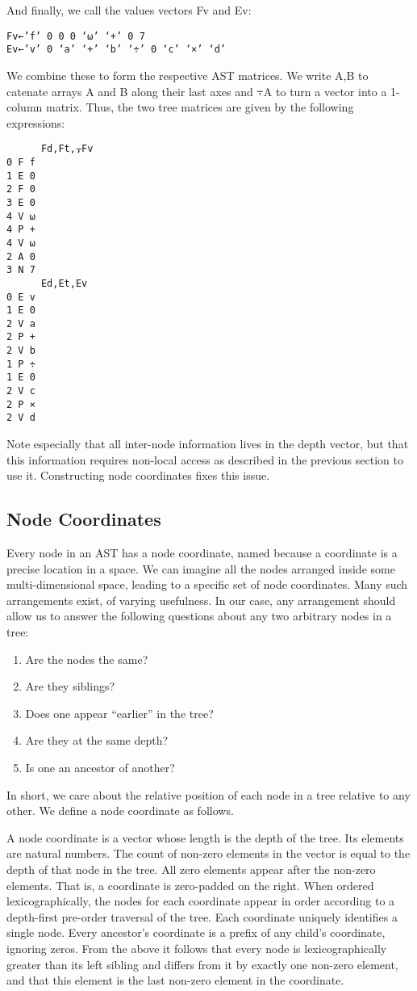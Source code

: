 \documentclass[numbers,preprint]{sigplanconf}
\begin{document}
And finally, we call the values vectors Fv and Ev:

\begin{verbatim}
Fv←’f’ 0 0 0 ‘⍵’ ‘+’ 0 7
Ev←’v’ 0 ‘a’ ‘+’ ‘b’ ‘÷’ 0 ‘c’ ‘×’ ‘d’
\end{verbatim}

We combine these to form the respective AST matrices. We write A,B
to catenate arrays A and B along their last axes and ⍪A to turn a
vector into a 1-column matrix. Thus, the two tree matrices are given
by the following expressions:

\begin{verbatim}
      Fd,Ft,⍪Fv
0 F f
1 E 0
2 F 0
3 E 0
4 V ⍵
4 P +
4 V ⍵
2 A 0
3 N 7
      Ed,Et,Ev
0 E v
1 E 0
2 V a
2 P +
2 V b
1 P ÷
1 E 0
2 V c
2 P ×
2 V d
\end{verbatim}

Note especially that all inter-node information lives in the depth
vector, but that this information requires non-local access as
described in the previous section to use it. Constructing node
coordinates fixes this issue.

\subsection{Node Coordinates}

Every node in an AST has a node coordinate, named because a coordinate
is a precise location in a space.  We can imagine all the nodes
arranged inside some multi-dimensional space, leading to a specific
set of node coordinates. Many such arrangements exist, of varying
usefulness. In our case, any arrangement should allow us to answer
the following questions about any two arbitrary nodes in a tree:

\begin{enumerate}[noitemsep]
\item Are the nodes the same?
\item Are they siblings?
\item Does one appear “earlier” in the tree?
\item Are they at the same depth?
\item Is one an ancestor of another?
\end{enumerate}

In short, we care about the relative position of each node in a tree
relative to any other. We define a node coordinate as follows.

A node coordinate is a vector whose length is the depth of the
tree. Its elements are natural numbers.  The count of non-zero elements
in the vector is equal to the depth of that node in the tree. All zero
elements appear after the non-zero elements. That is, a coordinate
is zero-padded on the right. When ordered lexicographically, the
nodes for each coordinate appear in order according to a depth-first
pre-order traversal of the tree. Each coordinate uniquely identifies a
single node. Every ancestor’s coordinate is a prefix of any child’s
coordinate, ignoring zeros. From the above it follows that every node
is lexicographically greater than its left sibling and differs from
it by exactly one non-zero element, and that this element is the last
non-zero element in the coordinate.
\end{document}
